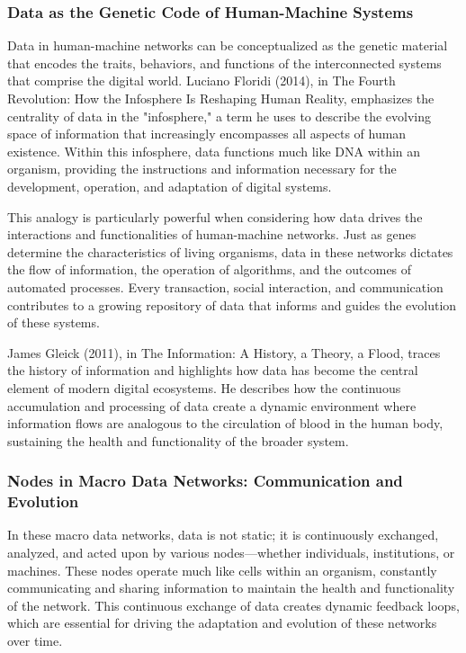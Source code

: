 \documentclass[12pt,twoside]{article}
\begin{document}
\subsubsection{Data as the Genetic Code of Human-Machine Systems}

Data in human-machine networks can be conceptualized as the genetic material that encodes the traits, behaviors, and functions of the interconnected systems that comprise the digital world. Luciano Floridi (2014), in The Fourth Revolution: How the Infosphere Is Reshaping Human Reality, emphasizes the centrality of data in the "infosphere," a term he uses to describe the evolving space of information that increasingly encompasses all aspects of human existence. Within this infosphere, data functions much like DNA within an organism, providing the instructions and information necessary for the development, operation, and adaptation of digital systems.

This analogy is particularly powerful when considering how data drives the interactions and functionalities of human-machine networks. Just as genes determine the characteristics of living organisms, data in these networks dictates the flow of information, the operation of algorithms, and the outcomes of automated processes. Every transaction, social interaction, and communication contributes to a growing repository of data that informs and guides the evolution of these systems.

James Gleick (2011), in The Information: A History, a Theory, a Flood, traces the history of information and highlights how data has become the central element of modern digital ecosystems. He describes how the continuous accumulation and processing of data create a dynamic environment where information flows are analogous to the circulation of blood in the human body, sustaining the health and functionality of the broader system.

\subsubsection{Nodes in Macro Data Networks: Communication and Evolution}

In these macro data networks, data is not static; it is continuously exchanged, analyzed, and acted upon by various nodes—whether individuals, institutions, or machines. These nodes operate much like cells within an organism, constantly communicating and sharing information to maintain the health and functionality of the network. This continuous exchange of data creates dynamic feedback loops, which are essential for driving the adaptation and evolution of these networks over time.
\end{document}

